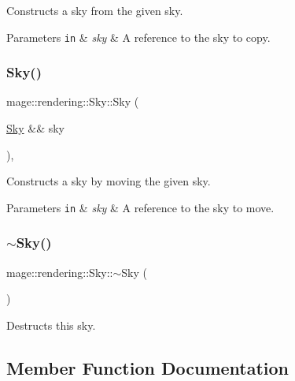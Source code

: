 Constructs a sky from the given sky.


\begin{DoxyParams}[1]{Parameters}
\mbox{\tt in}  & {\em sky} & A reference to the sky to copy. \\
\hline
\end{DoxyParams}
\hypertarget{classmage_1_1rendering_1_1_sky_aa1484300b69e97812d73e0f5281d8bbc}{}\label{classmage_1_1rendering_1_1_sky_aa1484300b69e97812d73e0f5281d8bbc} 
\subsubsection{\texorpdfstring{Sky()}{Sky()}\hspace{0.1cm}{\footnotesize\ttfamily [3/3]}}
{\footnotesize\ttfamily mage\+::rendering\+::\+Sky\+::\+Sky (\begin{DoxyParamCaption}\item[{\hyperlink{classmage_1_1rendering_1_1_sky}{Sky} \&\&}]{sky }\end{DoxyParamCaption})\hspace{0.3cm}{\ttfamily [default]}, {\ttfamily [noexcept]}}

Constructs a sky by moving the given sky.


\begin{DoxyParams}[1]{Parameters}
\mbox{\tt in}  & {\em sky} & A reference to the sky to move. \\
\hline
\end{DoxyParams}
\hypertarget{classmage_1_1rendering_1_1_sky_a948ac13394c361864f1da3dc27ab3326}{}\label{classmage_1_1rendering_1_1_sky_a948ac13394c361864f1da3dc27ab3326} 
\subsubsection{\texorpdfstring{$\sim$\+Sky()}{~Sky()}}
{\footnotesize\ttfamily mage\+::rendering\+::\+Sky\+::$\sim$\+Sky (\begin{DoxyParamCaption}{ }\end{DoxyParamCaption})\hspace{0.3cm}{\ttfamily [default]}}

Destructs this sky. 

\subsection{Member Function Documentation}
\hypertarget{classmage_1_1rendering_1_1_sky_a12023dbc7f9511152719cee35a84fc34}{}\label{classmage_1_1rendering_1_1_sky_a12023dbc7f9511152719cee35a84fc34} 
